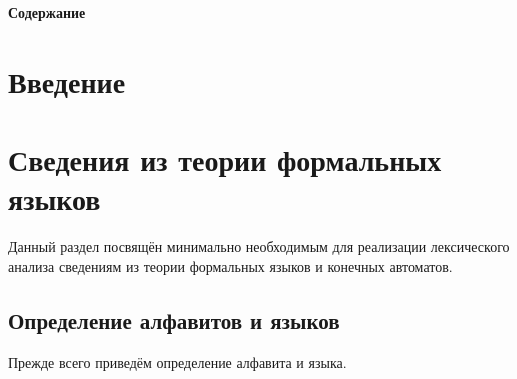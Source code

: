 \documentclass[12pt]{article}
\begin{document}
%
\large
\unitlength=5mm

\vspace*{5cm}

\renewcommand{\contentsname}{}

\centerline{\textbf{Содержание}}

\vspace*{1cm}

\tableofcontents

\newpage


\section*{Введение}
\section{Сведения из теории формальных языков}
Данный раздел посвящён минимально необходимым для реализации лексического анализа сведениям из теории формальных языков и конечных автоматов. 
	\subsection{Определение алфавитов и языков}
Прежде всего приведём определение алфавита и языка.
\end{document}
